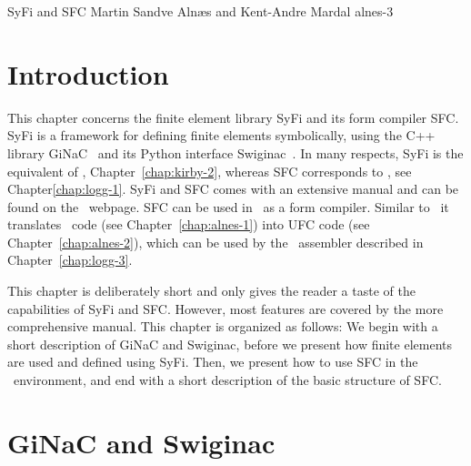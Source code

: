               {SyFi and SFC}
              {Martin Sandve Aln\ae s and Kent-Andre Mardal}
              {alnes-3}

\renewcommand{\AA}{\mathbf{A}}
\newcommand{\LL}{\mathbf{L}}
\newcommand{\JJ}{\mathbf{J}}

\section{Introduction}

This chapter concerns the finite element library SyFi and its form compiler SFC. 
SyFi is a framework for defining finite elements symbolically, using the 
C++ library GiNaC~\citep{BauerFrinkKreckel2000} and its Python interface
Swiginac~\citep{SkavhaugCertik2009}.  
In many respects, SyFi is the equivalent of \fiat,
   Chapter~\ref{chap:kirby-2}, whereas SFC corresponds to \ffc,
    see Chapter\ref{chap:logg-1}. SyFi and SFC comes with
an extensive manual \citep{AlnaesMardal2009a} and can be found on the \fenics\ webpage. 
SFC can be used in \fenics\ as a form compiler. Similar to \ffc\ it
translates \ufl\ code (see Chapter~\ref{chap:alnes-1}) 
into UFC code (see Chapter~\ref{chap:alnes-2}), 
which can be used by the \dolfin\ assembler described in
Chapter~\ref{chap:logg-3}. 

This chapter is deliberately short and only gives the reader a taste of the capabilities of SyFi and SFC. 
However, most features are covered by the more comprehensive manual. 
This chapter is organized as follows: We begin with a short description of GiNaC 
and Swiginac, before we present how finite elements are used and defined using SyFi.   
Then, we present how to use SFC in the \dolfin\ environment, and end with a short description of the basic structure of SFC. 

\section{GiNaC and Swiginac}

